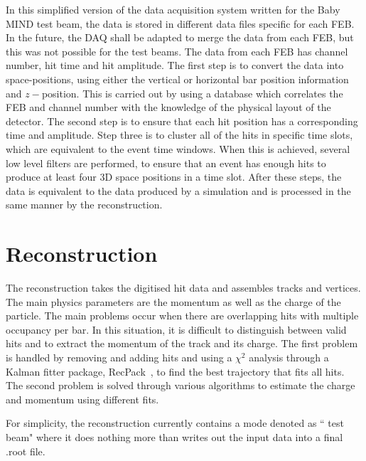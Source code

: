 
In this simplified version of the data acquisition system written for the Baby MIND test beam, the data is stored in different data files specific for each FEB. In the future, the DAQ shall be adapted to merge the data from each FEB, but this was not possible for the test beams. The data from each FEB has channel number, hit time and hit amplitude. The first step is to convert the data into space-positions, using either the vertical or horizontal bar position information and $z-$position. This is carried out by using a database which correlates the FEB and channel number with the knowledge of the physical layout of the detector. The second step is to ensure that each hit position has a corresponding time and amplitude. Step three is to cluster all of the hits in specific time slots, which are equivalent to the event time windows. When this is achieved, several low level filters are performed, to ensure that an event has enough hits to produce at least four 3D space positions in a time slot. After these steps, the data is equivalent to the data produced by a simulation and is processed in the same manner by the reconstruction.%

\section{Reconstruction}\label{sec:reconstruction}
The reconstruction takes the digitised hit data and assembles tracks and vertices. The main physics parameters are the momentum as well as the charge of the particle. The main problems occur when there are overlapping hits with multiple occupancy per bar. In this situation, it is difficult to distinguish between valid hits and to extract the momentum of the track and its charge.
The first problem is handled by removing and adding hits and using a $\chi^2$ analysis through a Kalman fitter package, RecPack~\cite{RecPack}, to find the best trajectory that fits all hits. The second problem is solved through various algorithms to estimate the charge and momentum using different fits.

For simplicity, the reconstruction currently contains a mode denoted as  `` test beam" where it does nothing more than writes out the input data into a final .root file.


